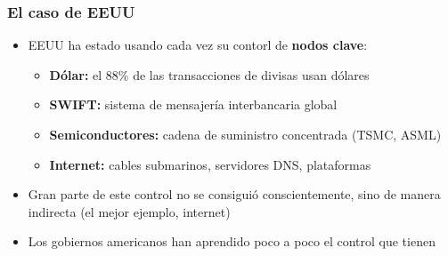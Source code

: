 \begin{frame}
\frametitle{El caso de EEUU}
\centering

  \begin{itemize}[<+->]
  \item EEUU ha estado usando cada vez su contorl de \textbf{nodos clave}:
  \begin{itemize}
    \item \textbf{Dólar:} el 88\% de las transacciones de divisas usan dólares
    \item \textbf{SWIFT:} sistema de mensajería interbancaria global
    \item \textbf{Semiconductores:} cadena de suministro concentrada (TSMC, ASML)
    \item \textbf{Internet:} cables submarinos, servidores DNS, plataformas
  \end{itemize}
  \item Gran parte de este control no se consiguió conscientemente, sino de manera indirecta (el mejor ejemplo, internet)
  \item Los gobiernos americanos han aprendido poco a poco el control que tienen
\end{itemize}


\end{frame}
\note{}

